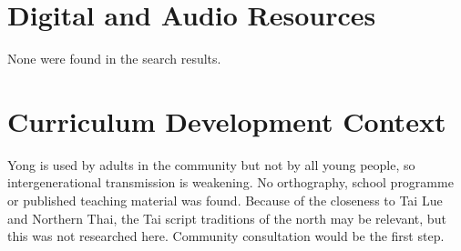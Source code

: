 \documentclass[12pt]{article}
\begin{document}
\section{Digital and Audio Resources}
None were found in the search results.

\section{Curriculum Development Context}
Yong is used by adults in the community but not by all young people, so intergenerational transmission is weakening. No orthography, school programme or published teaching material was found. Because of the closeness to Tai Lue and Northern Thai, the Tai script traditions of the north may be relevant, but this was not researched here. Community consultation would be the first step.
\end{document}
